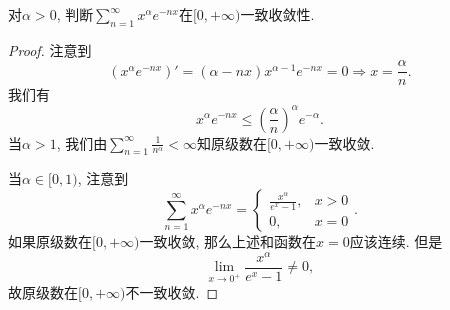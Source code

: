 \documentclass[../../main.tex]{subfiles}%
\begin{document}
\begin{example}
对$\alpha>0$, 判断$\sum\limits_{n=1}^{\infty}x^\alpha e^{-nx}$在$[0,+\infty)$一致收敛性.
\end{example}
\begin{proof}

注意到
$$
\left( x^{\alpha}e^{-nx} \right) '=(\alpha -nx)x^{\alpha -1}e^{-nx}=0\Rightarrow x=\frac{\alpha}{n}.
$$
我们有
$$
x^\alpha e^{-nx}\leqslant\left(\frac{\alpha}{n}\right)^\alpha e^{-\alpha}.
$$
当$\alpha>1$, 我们由$\sum\limits_{n=1}^{\infty}\frac{1}{n^\alpha}<\infty$知原级数在$[0,+\infty)$一致收敛.

当$\alpha\in[0,1)$, 注意到
$$
\sum_{n=1}^{\infty}x^\alpha e^{-nx}=
\begin{cases}
\frac{x^\alpha}{e^x-1},&x>0\\
0,&x=0
\end{cases}.
$$
如果原级数在$[0,+\infty)$一致收敛, 那么上述和函数在$x=0$应该连续. 但是
$$
\lim_{x\to0^+}\frac{x^\alpha}{e^x-1}\neq0,
$$
故原级数在$[0,+\infty)$不一致收敛.

\end{proof}
\end{document}
